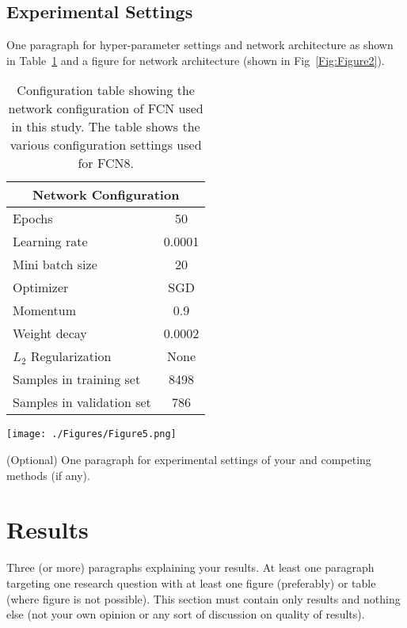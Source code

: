 \documentclass[conference]{IEEEtran}
\begin{document}
\subsection{Experimental Settings}
One paragraph for hyper-parameter settings and network architecture as shown in Table~\ref{tab:FCNConfiguration} and a figure for network architecture (shown in Fig~\ref{Fig:Figure2}).

\begin{table}[!ht]
\centering
\caption{Configuration table showing the network configuration of FCN used in this study. The table shows the various configuration settings used for FCN8.}
\label{tab:FCNConfiguration} 
\begin{tabular}{|l|c|}
\hline
\multicolumn{2}{|c|}{\textbf{Network Configuration}} 
\\ \hline
Epochs & 50 \\
Learning rate & 0.0001 \\
Mini batch size & 20 \\ 
Optimizer & SGD \\
Momentum & 0.9 \\
Weight decay & 0.0002 \\
$L_2$ Regularization & None \\
Samples in training set & 8498 \\
Samples in validation set & 786 \\ \hline
\end{tabular}
\end{table}

\begin{figure*}[!ht]
\centerline{\texttt{[image: ./Figures/Figure5.png]}}
\caption{Sample network architecture image. Make it in Powerpoint with svg images and save as pdf. Sanity check: Zoom in and pixels should not break.}
\label{Fig:Figure2}
\end{figure*}

(Optional) One paragraph for experimental settings of your and competing methods (if any).

\section{Results}
Three (or more) paragraphs explaining your results. At least one paragraph targeting one research question with at least one figure (preferably) or table (where figure is not possible).
This section must contain only results and nothing else (not your own opinion or any sort of discussion on quality of results).
\end{document}
